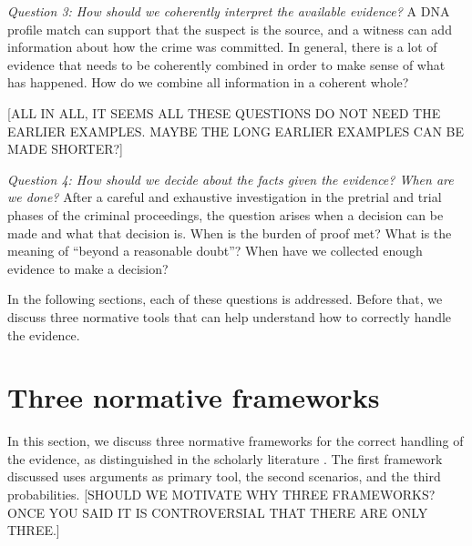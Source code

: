 \documentclass[10pt]{article}
\begin{document}
\textit{Question 3:	How should we coherently interpret the available evidence?}
A DNA profile match can support that the suspect is the source, and a witness can add information about how the crime was committed. In general, there is a lot of evidence that needs to be coherently combined in order to make sense of what has happened. How do we combine all information in a coherent whole?

[ALL IN ALL, IT SEEMS ALL THESE QUESTIONS DO NOT NEED 
THE EARLIER EXAMPLES. MAYBE THE LONG EARLIER
EXAMPLES CAN BE MADE SHORTER?]

\textit{Question 4:	How should we decide about the facts given the evidence? When are we done?}
After a careful and exhaustive investigation in the pretrial and trial phases of the criminal proceedings, the question arises when a decision can be made and what that decision is. When is the burden of proof met? What is the meaning of ``beyond a reasonable doubt''? When have we collected enough evidence to make a decision?

In the following sections, each of these questions is addressed. Before that, we discuss three normative tools that can help understand how to correctly handle the evidence. 

\section{Three normative frameworks}

In this section, we discuss three normative frameworks for the correct handling of the evidence, as distinguished in the scholarly literature \citep{andersonEtal2005,kapteinEtal2009,dawidEtal2011}. The first framework discussed uses arguments as primary tool, the second scenarios, and the third probabilities. 
[SHOULD WE MOTIVATE WHY THREE FRAMEWORKS? ONCE YOU SAID 
IT IS CONTROVERSIAL THAT THERE ARE ONLY THREE.]
\end{document}
